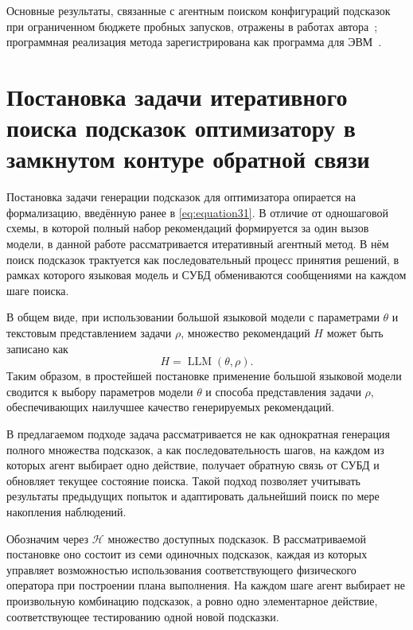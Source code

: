Основные результаты, связанные с агентным поиском конфигураций подсказок при ограниченном бюджете пробных запусков, отражены в работах автора~\cite{11289347,burl2025}; программная реализация метода зарегистрирована как программа для ЭВМ~\cite{vasilenko_patent}.

\section{Постановка задачи итеративного поиска подсказок оптимизатору в замкнутом контуре обратной связи}\label{sec:ch4_problem}

Постановка задачи генерации подсказок для оптимизатора опирается на формализацию, введённую ранее в \cref{eq:equation31}. В отличие от одношаговой схемы, в которой полный набор рекомендаций формируется за один вызов модели, в данной работе рассматривается итеративный агентный метод. В нём поиск подсказок трактуется как последовательный процесс принятия решений, в рамках которого языковая модель и СУБД обмениваются сообщениями на каждом шаге поиска.

В общем виде, при использовании большой языковой модели с параметрами $\theta$ и текстовым представлением задачи $\rho$, множество рекомендаций $H$ может быть записано как
\begin{equation}
    \label{eq:llm_task}
    H = \operatorname{LLM}(\theta, \rho).
\end{equation}
Таким образом, в простейшей постановке применение большой языковой модели сводится к выбору параметров модели $\theta$ и способа представления задачи $\rho$, обеспечивающих наилучшее качество генерируемых рекомендаций.

В предлагаемом подходе задача рассматривается не как однократная генерация полного множества подсказок, а как последовательность шагов, на каждом из которых агент выбирает одно действие, получает обратную связь от СУБД и обновляет текущее состояние поиска. Такой подход позволяет учитывать результаты предыдущих попыток и адаптировать дальнейший поиск по мере накопления наблюдений.

Обозначим через $\mathcal{H}$ множество доступных подсказок. В рассматриваемой постановке оно состоит из семи одиночных подсказок, каждая из которых управляет возможностью использования соответствующего физического оператора при построении плана выполнения. На каждом шаге агент выбирает не произвольную комбинацию подсказок, а ровно одно элементарное действие, соответствующее тестированию одной новой подсказки.

